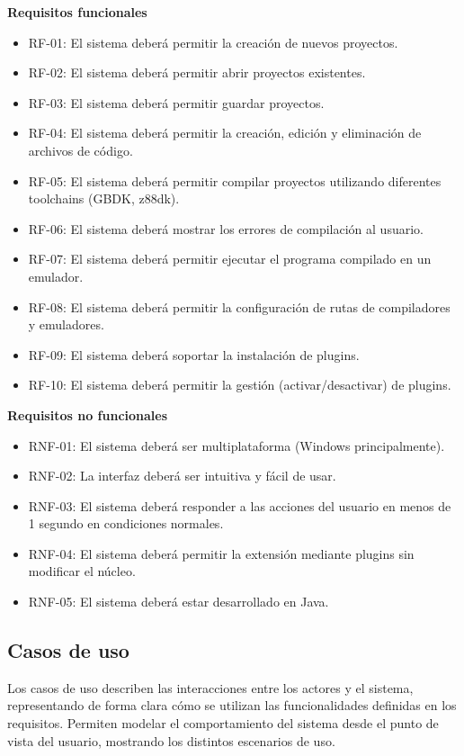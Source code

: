 \documentclass[../../main.tex]{subfiles}
\begin{document}
\textbf{Requisitos funcionales}
\begin{itemize}
    \item RF-01: El sistema deberá permitir la creación de nuevos proyectos.
    \item RF-02: El sistema deberá permitir abrir proyectos existentes.
    \item RF-03: El sistema deberá permitir guardar proyectos.
    \item RF-04: El sistema deberá permitir la creación, edición y eliminación de archivos de código.
    \item RF-05: El sistema deberá permitir compilar proyectos utilizando diferentes toolchains (GBDK, z88dk).
    \item RF-06: El sistema deberá mostrar los errores de compilación al usuario.
    \item RF-07: El sistema deberá permitir ejecutar el programa compilado en un emulador.
    \item RF-08: El sistema deberá permitir la configuración de rutas de compiladores y emuladores.
    \item RF-09: El sistema deberá soportar la instalación de plugins.
    \item RF-10: El sistema deberá permitir la gestión (activar/desactivar) de plugins.
\end{itemize}

\clearpage

\textbf{Requisitos no funcionales}
\begin{itemize}
    \item RNF-01: El sistema deberá ser multiplataforma (Windows principalmente).
    \item RNF-02: La interfaz deberá ser intuitiva y fácil de usar.
    \item RNF-03: El sistema deberá responder a las acciones del usuario en menos de 1 segundo en condiciones normales.
    \item RNF-04: El sistema deberá permitir la extensión mediante plugins sin modificar el núcleo.
    \item RNF-05: El sistema deberá estar desarrollado en Java.
\end{itemize}

\subsection{Casos de uso}

\par{Los casos de uso describen las interacciones entre los actores y el sistema, representando de forma clara cómo se utilizan las funcionalidades definidas en los requisitos. Permiten modelar el comportamiento del sistema desde el punto de vista del usuario, mostrando los distintos escenarios de uso.}
\end{document}
